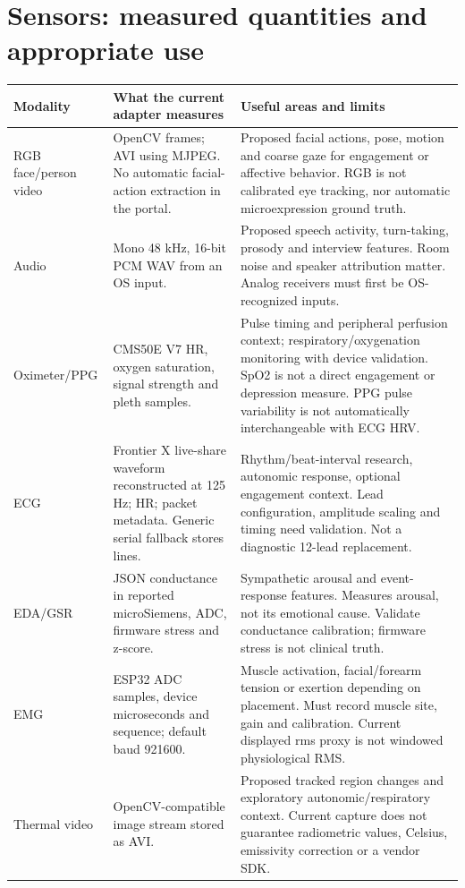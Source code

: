 \documentclass[11pt,a4paper]{article}
\begin{document}
\section{Sensors: measured quantities and appropriate use}
\small
\begin{longtable}{@{}L{.18\textwidth}L{.34\textwidth}L{.41\textwidth}@{}}
\toprule Modality & What the current adapter measures & Useful areas and limits\\\midrule\endhead
RGB face/person video & OpenCV frames; AVI using MJPEG. No automatic facial-action extraction in the portal. & Proposed facial actions, pose, motion and coarse gaze for engagement or affective behavior. RGB is not calibrated eye tracking, nor automatic microexpression ground truth.\\
Audio & Mono 48 kHz, 16-bit PCM WAV from an OS input. & Proposed speech activity, turn-taking, prosody and interview features. Room noise and speaker attribution matter. Analog receivers must first be OS-recognized inputs.\\
Oximeter/PPG & CMS50E V7 HR, oxygen saturation, signal strength and pleth samples. & Pulse timing and peripheral perfusion context; respiratory/oxygenation monitoring with device validation. SpO2 is not a direct engagement or depression measure. PPG pulse variability is not automatically interchangeable with ECG HRV.\\
ECG & Frontier X live-share waveform reconstructed at 125 Hz; HR; packet metadata. Generic serial fallback stores lines. & Rhythm/beat-interval research, autonomic response, optional engagement context. Lead configuration, amplitude scaling and timing need validation. Not a diagnostic 12-lead replacement.\\
EDA/GSR & JSON conductance in reported microSiemens, ADC, firmware stress and z-score. & Sympathetic arousal and event-response features. Measures arousal, not its emotional cause. Validate conductance calibration; firmware stress is not clinical truth.\\
EMG & ESP32 ADC samples, device microseconds and sequence; default baud 921600. & Muscle activation, facial/forearm tension or exertion depending on placement. Must record muscle site, gain and calibration. Current displayed rms proxy is not windowed physiological RMS.\\
Thermal video & OpenCV-compatible image stream stored as AVI. & Proposed tracked region changes and exploratory autonomic/respiratory context. Current capture does not guarantee radiometric values, Celsius, emissivity correction or a vendor SDK.\\

\end{longtable}
\end{document}
